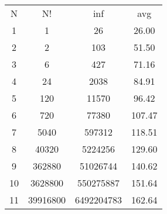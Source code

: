 \documentclass[a4paper,14pt]{report}
\begin{document}
\begin{center}
\begin{tabular}{| c | c | c | c |} 
 \hline
 N & N! & inf & avg \\ [1ex] 
 1 & 1 & 26 & 26.00 \\ 
 2 & 2 & 103 &  51.50 \\
 3 & 6 & 427 &  71.16\\
 4 & 24 & 2038 &  84.91 \\
 5 & 120 & 11570 &  96.42 \\ 
 6 & 720 & 77380 &  107.47 \\ 
 7 & 5040 & 597312 &  118.51 \\ 
 8 & 40320 & 5224256 &   129.60 \\
 9 & 362880 & 51026744 &  140.62 \\
 10 & 3628800 & 550275887 &  151.64\\
 11 & 39916800 & 6492204783 &  162.64 \\ [1ex] 
 \hline
\end{tabular}
\end{center}
\end{document}
